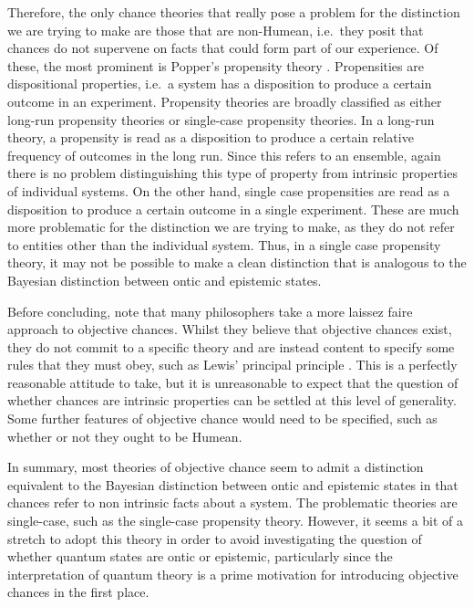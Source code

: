 \documentclass[DIV=calc,fontsize=12pt]{scrartcl} %
\theoremstyle{definition}
\theoremstyle{plain}
\begin{document}
Therefore, the only chance theories that really pose a problem for the
distinction we are trying to make are those that are non-Humean, i.e.\
they posit that chances do not supervene on facts that could form part
of our experience.  Of these, the most prominent is Popper's
propensity theory \cite{Popper2011}.  Propensities are dispositional
properties, i.e.\ a system has a disposition to produce a certain
outcome in an experiment.  Propensity theories are broadly classified
as either long-run propensity theories or single-case propensity
theories.  In a long-run theory, a propensity is read as a disposition
to produce a certain relative frequency of outcomes in the long run.
Since this refers to an ensemble, again there is no problem
distinguishing this type of property from intrinsic properties of
individual systems.  On the other hand, single case propensities are
read as a disposition to produce a certain outcome in a single
experiment.  These are much more problematic for the distinction we
are trying to make, as they do not refer to entities other than the
individual system.  Thus, in a single case propensity theory, it may
not be possible to make a clean distinction that is analogous to the
Bayesian distinction between ontic and epistemic states.

Before concluding, note that many philosophers take a more laissez
faire approach to objective chances.  Whilst they believe that
objective chances exist, they do not commit to a specific theory and
are instead content to specify some rules that they must obey, such as
Lewis' principal principle \cite{Lewis2011}.  This is a perfectly
reasonable attitude to take, but it is unreasonable to expect that the
question of whether chances are intrinsic properties can be settled at
this level of generality.  Some further features of objective chance
would need to be specified, such as whether or not they ought to be
Humean.

In summary, most theories of objective chance seem to admit a
distinction equivalent to the Bayesian distinction between ontic and
epistemic states in that chances refer to non intrinsic facts about a
system.  The problematic theories are single-case, such as the
single-case propensity theory.  However, it seems a bit of a stretch
to adopt this theory in order to avoid investigating the question of
whether quantum states are ontic or epistemic, particularly since the
interpretation of quantum theory is a prime motivation for introducing
objective chances in the first place.
\end{document}
